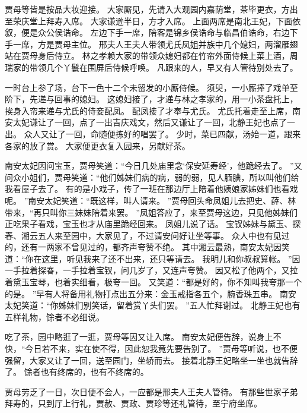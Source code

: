 贾母等皆是按品大妆迎接。
大家厮见，先请入大观园内嘉荫堂，茶毕更衣，方出至荣庆堂上拜寿入席。
大家谦逊半日，方才入席。
上面两席是南北王妃，下面依叙，便是众公侯诰命。
左边下手一席，陪客是锦乡侯诰命与临昌伯诰命，右边下手一席，方是贾母主位。
邢夫人王夫人带领尤氏凤姐并族中几个媳妇，两溜雁翅站在贾母身后侍立。
林之孝赖大家的带领众媳妇都在竹帘外面侍候上菜上酒，周瑞家的带领几个丫鬟在围屏后侍候呼唤。
凡跟来的人，早又有人管待别处去了。
\par
一时台上参了场，台下一色十二个未留发的小厮侍候。
须臾，一小厮捧了戏单至阶下，先递与回事的媳妇。
这媳妇接了，才递与林之孝家的，用一小茶盘托上，挨身入帘来递与尤氏的侍妾配凤。
配凤接了才奉与尤氏。
尤氏托着走至上席，南安太妃谦让了一回，点了一出吉庆戏文，然后又谦让了一回，北静王妃也点了一出。
众人又让了一回，命随便拣好的唱罢了。
少时，菜已四献，汤始一道，跟来各家的放了赏。
大家便更衣复入园来，另献好茶。
\par
南安太妃因问宝玉，贾母笑道：“今日几处庙里念‘保安延寿经’，他跪经去了。
”又问众小姐们，贾母笑道：“他们姊妹们病的病，弱的弱，见人腼腆，所以叫他们给我看屋子去了。
有的是小戏子，传了一班在那边厅上陪着他姨娘家姊妹们也看戏呢。
”南安太妃笑道：“既这样，叫人请来。
”贾母回头命凤姐儿去把史、薛、林带来，“再只叫你三妹妹陪着来罢。
”凤姐答应了，来至贾母这边，只见他姊妹们正吃果子看戏，宝玉也才从庙里跪经回来。
凤姐儿说了话。
宝钗姊妹与黛玉、探春、湘云五人来至园中，大家见了，不过请安问好让坐等事。
众人中也有见过的，还有一两家不曾见过的，都齐声夸赞不绝。
其中湘云最熟，南安太妃因笑道：“你在这里，听见我来了还不出来，还只等请去。
我明儿和你叔叔算帐。
”因一手拉着探春，一手拉着宝钗，问几岁了，又连声夸赞。
因又松了他两个，又拉着黛玉宝琴，也着实细看，极夸一回。
又笑道：“都是好的，你不知叫我夸那一个的是。
”早有人将备用礼物打点出五分来：金玉戒指各五个，腕香珠五串。
南安太妃笑道：“你姊妹们别笑话，留着赏丫头们罢。
”五人忙拜谢过。
北静王妃也有五样礼物，馀者不必细说。
\par
吃了茶，园中略逛了一逛，贾母等因又让入席。
南安太妃便告辞，说身上不快，“今日若不来，实在使不得，因此恕我竟先要告别了。
”贾母等听说，也不便强留，大家又让了一回，送至园门，坐轿而去。
接着北静王妃略坐一坐也就告辞了。
馀者也有终席的，也有不终席的。
\par
贾母劳乏了一日，次日便不会人，一应都是邢夫人王夫人管待。
有那些世家子弟拜寿的，只到厅上行礼，贾赦、贾政、贾珍等还礼管待，至宁府坐席。
